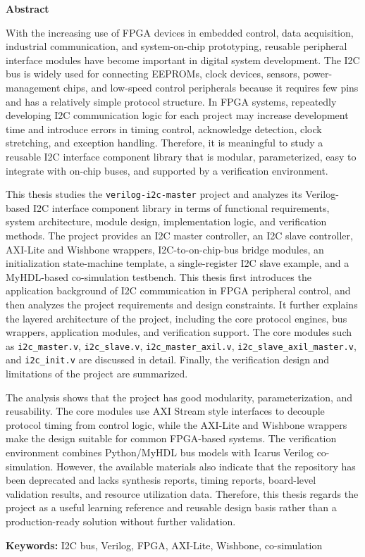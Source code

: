\documentclass[12pt,a4paper]{article}
\numberwithin{equation}{section}
\newcommand{\sanhao}{\zihao{3}}
\newcommand{\sihao}{\zihao{4}}
\newenvironment{abstracten}{
    \begin{center}
        \textbf{\sanhao Abstract}
    \end{center}
    \addcontentsline{toc}{section}{Abstract}
}{\par}
\newcommand{\keywordsen}[1]{
    \vspace{\baselineskip}
    {\textbf{\sihao Keywords:}} #1
}
\begin{document}
\begin{abstracten}
    With the increasing use of FPGA devices in embedded control, data acquisition, industrial communication, and system-on-chip prototyping, reusable peripheral interface modules have become important in digital system development. The I2C bus is widely used for connecting EEPROMs, clock devices, sensors, power-management chips, and low-speed control peripherals because it requires few pins and has a relatively simple protocol structure. In FPGA systems, repeatedly developing I2C communication logic for each project may increase development time and introduce errors in timing control, acknowledge detection, clock stretching, and exception handling. Therefore, it is meaningful to study a reusable I2C interface component library that is modular, parameterized, easy to integrate with on-chip buses, and supported by a verification environment.

    This thesis studies the \texttt{verilog-i2c-master} project and analyzes its Verilog-based I2C interface component library in terms of functional requirements, system architecture, module design, implementation logic, and verification methods. The project provides an I2C master controller, an I2C slave controller, AXI-Lite and Wishbone wrappers, I2C-to-on-chip-bus bridge modules, an initialization state-machine template, a single-register I2C slave example, and a MyHDL-based co-simulation testbench. This thesis first introduces the application background of I2C communication in FPGA peripheral control, and then analyzes the project requirements and design constraints. It further explains the layered architecture of the project, including the core protocol engines, bus wrappers, application modules, and verification support. The core modules such as \texttt{i2c\_master.v}, \texttt{i2c\_slave.v}, \texttt{i2c\_master\_axil.v}, \texttt{i2c\_slave\_axil\_master.v}, and \texttt{i2c\_init.v} are discussed in detail. Finally, the verification design and limitations of the project are summarized.

    The analysis shows that the project has good modularity, parameterization, and reusability. The core modules use AXI Stream style interfaces to decouple protocol timing from control logic, while the AXI-Lite and Wishbone wrappers make the design suitable for common FPGA-based systems. The verification environment combines Python/MyHDL bus models with Icarus Verilog co-simulation. However, the available materials also indicate that the repository has been deprecated and lacks synthesis reports, timing reports, board-level validation results, and resource utilization data. Therefore, this thesis regards the project as a useful learning reference and reusable design basis rather than a production-ready solution without further validation.

\end{abstracten}
\keywordsen{I2C bus, Verilog, FPGA, AXI-Lite, Wishbone, co-simulation}
\end{document}
